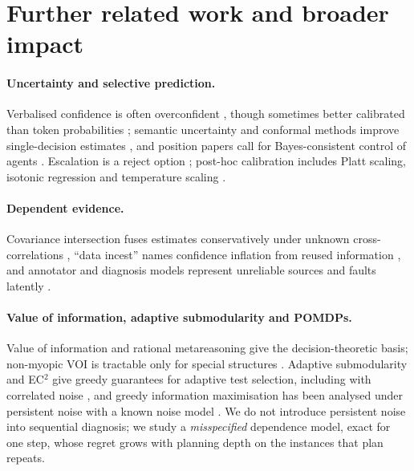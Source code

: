 \section{Further related work and broader impact}\label{app:related-moved-archived}
\paragraph{Uncertainty and selective prediction.}
Verbalised confidence is often overconfident \citep{xiong2024can}, though sometimes better calibrated than token probabilities \citep{tian2023just}; semantic uncertainty and conformal methods improve single-decision estimates \citep{kuhn2023semantic,ren2023robots}, and position papers call for Bayes-consistent control of agents \citep{kirchhof2025position,papamarkou2026position}.
Escalation is a reject option \citep{chow1970optimum,geifman2017selective}; post-hoc calibration includes Platt scaling, isotonic regression and temperature scaling \citep{platt1999probabilistic,zadrozny2002transforming,guo2017calibration}.

\paragraph{Dependent evidence.}
Covariance intersection fuses estimates conservatively under unknown cross-correlations \citep{julier1997nondivergent}, ``data incest'' names confidence inflation from reused information \citep{krishnamurthy2013misinformation}, and annotator and diagnosis models represent unreliable sources and faults latently \citep{dawid1979maximum,dekleer1987diagnosing}.

\paragraph{Value of information, adaptive submodularity and POMDPs.}
Value of information \citep{howard1966information} and rational metareasoning \citep{russell1991right} give the decision-theoretic basis; non-myopic VOI is tractable only for special structures \citep{krause2005optimal,krause2009optimal}.
Adaptive submodularity and EC$^2$ give greedy guarantees for adaptive test selection, including with correlated noise \citep{golovin2011adaptive,golovin2010near}, and greedy information maximisation has been analysed under persistent noise with a known noise model \citep{chen2015sequential}.
We do not introduce persistent noise into sequential diagnosis; we study a \emph{misspecified} dependence model, exact for one step, whose regret grows with planning depth on the instances that plan repeats.

